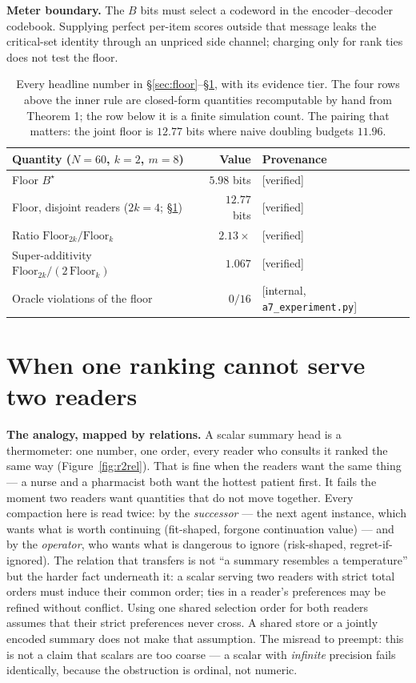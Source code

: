 \documentclass[11pt,a4paper]{article}
\begin{document}
\textbf{Meter boundary.} The $B$ bits must select a codeword in the
encoder--decoder codebook. Supplying perfect per-item scores outside that
message leaks the critical-set identity through an unpriced side channel;
charging only for rank ties does not test the floor.

\begin{table}[t]
\centering
\begin{tabular}{@{}lrl@{}}
\toprule
Quantity ($N{=}60$, $k{=}2$, $m{=}8$) & Value & Provenance \\
\midrule
Floor $B^\star$ & $5.98$ bits & [verified] \\
Floor, disjoint readers ($2k{=}4$; \S\ref{sec:split}) & $12.77$ bits & [verified] \\
Ratio $\mathrm{Floor}_{2k}/\mathrm{Floor}_{k}$ & $2.13\times$ & [verified] \\
Super-additivity $\mathrm{Floor}_{2k}/(2\,\mathrm{Floor}_{k})$ & $1.067$ & [verified] \\
\midrule
Oracle violations of the floor & $0/16$ & [internal, \texttt{a7\_experiment.py}] \\

\bottomrule
\end{tabular}
\caption{Every headline number in \S\ref{sec:floor}--\S\ref{sec:split}, with its evidence tier. The four rows above the inner rule are closed-form quantities recomputable by hand from Theorem 1; the row below it is a finite simulation count. The pairing that matters: the joint floor is $12.77$ bits where naive doubling budgets $11.96$.}
\label{tab:numbers}
\end{table}





\section{When one ranking cannot serve two readers}\label{sec:split}
\textbf{The analogy, mapped by relations.} A scalar summary head is a thermometer: one number, one order, every reader who consults it ranked the same way (Figure~\ref{fig:r2rel}). That is fine when the readers want the same thing --- a nurse and a pharmacist both want the hottest patient first. It fails the moment two readers want quantities that do not move together. Every compaction here is read twice: by the \emph{successor} --- the next agent instance, which wants what is worth continuing (fit-shaped, forgone continuation value) --- and by the \emph{operator}, who wants what is dangerous to ignore (risk-shaped, regret-if-ignored). The relation that transfers is not ``a summary resembles a temperature'' but the harder fact underneath it: a scalar serving two readers with strict total orders must induce their common order; ties in a reader's preferences may be refined without conflict. Using one shared selection order for both readers assumes that their strict preferences never cross. A shared store or a jointly encoded summary does not make that assumption. The misread to preempt: this is not a claim that scalars are too coarse --- a scalar with \emph{infinite} precision fails identically, because the obstruction is ordinal, not numeric.
\end{document}
